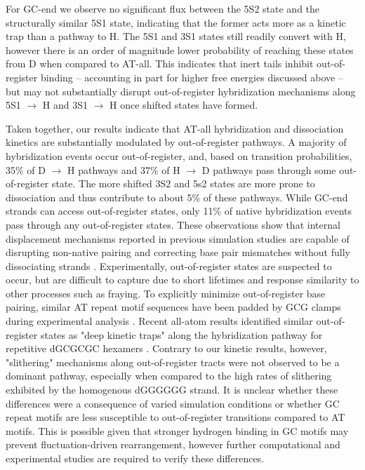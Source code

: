 \documentclass[journal=jpcbfk,manuscript=article]{achemso}
\begin{document}
For GC-end we observe no significant flux between the 5S2 state and the structurally similar 5S1 state, indicating that the former acts more as a kinetic trap than a pathway to H. The 5S1 and 3S1 states still readily convert with H, however there is an order of magnitude lower probability of reaching these states from D when compared to AT-all. This indicates that inert tails inhibit out-of-register binding -- accounting in part for higher free energies discussed above -- but may not substantially disrupt out-of-register hybridization mechanisms along 5S1 $\rightarrow$ H and 3S1 $\rightarrow$ H once shifted states have formed.


Taken together, our results indicate that AT-all hybridization and dissociation kinetics are substantially modulated by out-of-register pathways. A majority of hybridization events occur out-of-register, and, based on transition probabilities, 35\% of D $\rightarrow$ H pathways and 37\% of H $\rightarrow$ D pathways pass through some out-of-register state. The more shifted 3S2 and 5s2 states are more prone to dissociation and thus contribute to about 5\% of these pathways. While GC-end strands can access out-of-register states, only 11\% of native hybridization events pass through any out-of-register states. These observations show that internal displacement mechanisms reported in previous simulation studies are capable of disrupting non-native pairing and correcting base pair mismatches without fully dissociating strands \citep{Romano2013DNADependence, Markegard2015, Maciejczyk2014DNAModel}. Experimentally, out-of-register states are suspected to occur, but are difficult to capture due to short lifetimes and response similarity to other processes such as fraying. To explicitly minimize out-of-register base pairing, similar AT repeat motif sequences have been padded by GCG clamps during experimental analysis \cite{Wyer2014KineticsAT-tracts}. Recent all-atom results identified similar out-of-register states as "deep kinetic traps" along the hybridization pathway for repetitive dGCGCGC hexamers \citep{Xiao2019}. Contrary to our kinetic results, however, "slithering" mechanisms along out-of-register tracts were not observed to be a dominant pathway, especially when compared to the high rates of slithering exhibited by the homogenous dGGGGGG strand. It is unclear whether these differences were a consequence of varied simulation conditions or whether GC repeat motifs are less susceptible to out-of-register transitions compared to AT motifs. This is possible given that stronger hydrogen binding in GC motifs may prevent fluctuation-driven rearrangement, however further computational and experimental studies are required to verify these differences.
\end{document}
